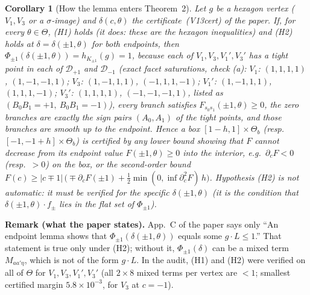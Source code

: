 \documentclass[11pt]{article}
\newtheorem{corollary}{Corollary}
\begin{document}
\begin{corollary}[How the lemma enters Theorem~2]
Let $g$ be a hexagon vertex ($V_1,V_3$ or a $\sigma$-image) and $\delta(c,\theta)$ the certificate~(V13cert) of the paper.
If, for every $\theta\in\Theta$, (H1) holds (it does: these are the hexagon inequalities) and (H2) holds at
$\delta=\delta(\pm1,\theta)$ for both endpoints, then $\Phi_{\pm1}(\delta(\pm1,\theta))=h_{K_{\pm1}}(g)=1$, because each of $V_1,V_3,V_1',V_3'$ has a tight
point in each of $\mathcal D_{+1}$ and $\mathcal D_{-1}$ (exact facet saturations, check (a):
$V_1$: $(1,1,1,1)$, $(1,-1,-1,1)$; $V_3$: $(1,-1,1,1)$, $(-1,1,1,-1)$; $V_1'$: $(1,-1,1,1)$, $(1,1,1,-1)$;
$V_3'$: $(1,1,1,1)$, $(-1,-1,-1,1)$, listed as $(B_0B_1=+1,\ B_0B_1=-1)$), every branch satisfies $F_{s_0s_1}(\pm1,\theta)\ge0$, the zero branches
are exactly the sign pairs $(A_0,A_1)$ of the tight points, and those branches are smooth up to the endpoint.
Hence a box $[1-h,1]\times\Theta_b$ (resp.\ $[-1,-1+h]\times\Theta_b$) is certified by any lower bound showing that
$F$ cannot decrease from its endpoint value $F(\pm1,\theta)\ge0$ into the interior, e.g.\ $\partial_cF<0$
(resp.\ $>0$) on the box, or the second-order bound
$F(c)\ge |c\mp1|\,\bigl(\mp\partial_cF(\pm1)+\tfrac12\min(0,\inf\partial_c^2F)\,h\bigr)$.
Hypothesis (H2) is \emph{not} automatic: it must be verified for the specific $\delta(\pm1,\theta)$
(it is the condition that $\delta(\pm1,\theta)\cdot f_{\pm}$ lies in the flat set of $\Phi_{\pm1}$).
\end{corollary}

\noindent\textbf{Remark (what the paper states).} App.~C of the paper says only ``An endpoint lemma shows that
$\Phi_{\pm1}(\delta(\pm1,\theta))$ equals some $g\cdot L\le1$.'' That statement is true only under (H2); without it,
$\Phi_{\pm1}(\delta)$ can be a mixed term $M_{aa'\eta}$, which is not of the form $g\cdot L$. In the audit,
(H1) and (H2) were verified on all of $\Theta$ for $V_1,V_3,V_1',V_3'$ (all $2\times8$ mixed terms per vertex are $<1$; smallest certified margin $5.8\times10^{-3}$, for $V_3$ at $c=-1$).
\end{document}
